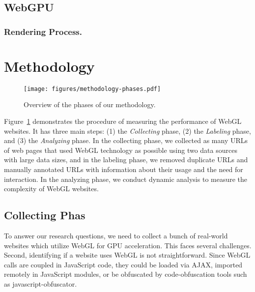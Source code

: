 
\subsection{WebGPU}

\subsubsection{Rendering Process.}

\section{Methodology}


\begin{figure}[tp]
\centering
\texttt{[image: figures/methodology-phases.pdf]}
\caption{Overview of the phases of our methodology.}\label{fig_methodology_phases}
\end{figure}

Figure\ \ref{fig_methodology_phases} demonstrates the procedure of measuring the performance of WebGL websites. It has three main steps: (1) the \textit{Collecting} phase, (2) the \textit{Labeling} phase, and (3) the \textit{Analyzing} phase. In the collecting phase, we collected as many URLs of web pages that used WebGL technology as possible using two data sources with large data sizes, and in the labeling phase, we removed duplicate URLs and manually annotated URLs with information about their usage and the need for interaction. In the analyzing phase, we conduct dynamic analysis to measure the complexity of WebGL websites.


\subsection{Collecting Phas\label{collecting_phase}}

To answer our research questions, we need to collect a bunch of real-world websites which utilize WebGL for GPU acceleration. This faces several challenges.  Second, identifying if a website uses WebGL is not straightforward. Since WebGL calls are coupled in JavaScript code, they could be loaded via AJAX, imported remotely in JavaScript modules, or be obfuscated by code-obfuscation tools such as javascript-obfuscator\cite{noauthor_javascript_2023}.

